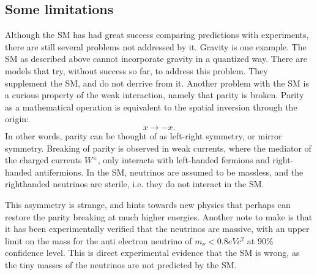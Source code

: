 \subsection*{Some limitations}
Although the SM has had great success comparing predictions with experiments,
there are still several problems not addressed by it. Gravity is one example. The SM
as described above cannot incorporate gravity in a quantized way. There 
are models that try, without success so far, to address this problem. They supplement the SM,
and do not derrive from it. Another problem with the SM is a curious property of the weak interaction, 
namely that parity is broken. Parity as a mathematical operation is equivalent to the spatial inversion 
through the origin\cite{Thomson:2013zua}:
\begin{equation}
    x \to -x.
\end{equation}
In other words, parity can be thought of as left-right symmetry, or mirror symmetry. Breaking of parity is observed
in weak currents, where the mediator of the charged currents $W^{\pm}$, only interacts with 
left-handed fermions and right-handed antifermions. In the SM, neutrinos are assumed to be massless, and the righthanded 
neutrinos are sterile, i.e. they do not interact in the SM. \par 
This asymmetry is strange, and hints towards new physics that perhaps can restore the parity breaking at much higher energies. 
Another note to make is that it has been experimentally verified that the neutrinos are massive\cite{Katrin_neutrinos},
with an upper limit on the mass for the anti electron neutrino of $m_{\nu} < 0.8eVc^2$ at $90\%$ confidence level.
This is direct experimental evidence that the SM is wrong, as the tiny masses of the neutrinos are not predicted by the SM. 








